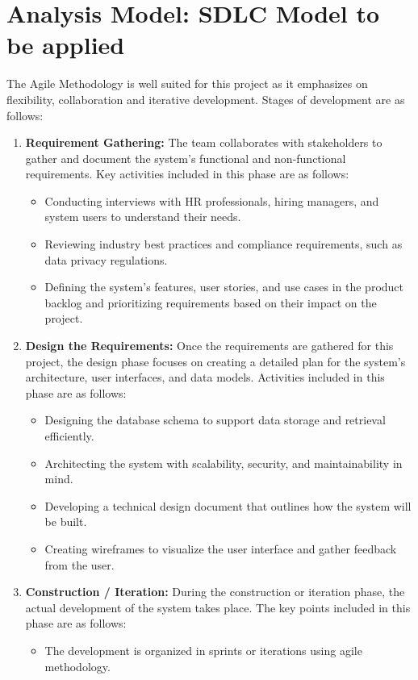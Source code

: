 \section{Analysis Model: SDLC Model to be applied}
The Agile Methodology is well suited for this project as it emphasizes on flexibility, collaboration and iterative development. Stages of development are as follows:
\begin{enumerate}
	\item \textbf{Requirement Gathering:} The team collaborates with stakeholders to gather and document the system's functional and non-functional requirements. Key activities included in this phase are as follows:
		\begin{itemize}
			\item Conducting interviews with HR professionals, hiring managers, and system users to understand their needs.
			\item Reviewing industry best practices and compliance requirements, such as data privacy regulations.
			\item Defining the system's features, user stories, and use cases in the product backlog and prioritizing requirements based on their impact on the project.
		\end{itemize}
	\item \textbf{Design the Requirements:} Once the  requirements are gathered for this project, the design phase focuses on creating a detailed plan for the system's architecture, user interfaces, and data models. Activities included in this phase are as follows:
		\begin{itemize}
			\item Designing the database schema to support data storage and retrieval efficiently.
			\item Architecting the system with scalability, security, and maintainability in mind.
			\item Developing a technical design document that outlines how the system will be built.
			\item Creating wireframes to visualize the user interface and gather feedback from the user.
		\end{itemize}
	\item \textbf{Construction / Iteration:} During the construction or iteration phase, the actual development of the system takes place. The key points included in this phase are as follows:
		\begin{itemize}
			\item The development is organized in sprints or iterations using agile methodology.

\end{itemize}
\end{enumerate}
